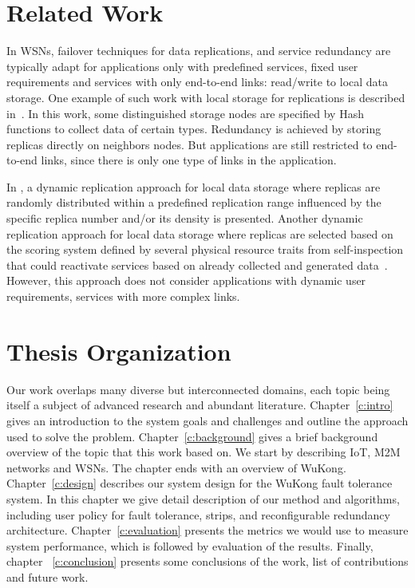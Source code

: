 \section{Related Work}


In WSNs, failover techniques for data replications, and service redundancy are
typically adapt for applications only with predefined services, fixed user
requirements and services with only end-to-end links: read/write to local data
storage. One example of such work with local storage for replications is
described in~\cite{Ratnasamy2002}. In this work, some distinguished storage
nodes are specified by Hash functions to collect data of certain types.
Redundancy is achieved by storing replicas directly on neighbors nodes. But
applications are still restricted to end-to-end links, since there is only one
type of links in the application.

In \cite{Piotrowski2009}, a dynamic replication approach for local data storage
where replicas are randomly distributed within a predefined replication range
influenced by the specific replica number and/or its density is presented. 
Another dynamic replication approach for local data storage where replicas are
selected based on the scoring system defined by several physical resource traits
from self-inspection that could reactivate services based on already collected
and generated data~\cite{Neumann2010}. However, this approach does not consider
applications with dynamic user requirements, services with more complex links.

\section{Thesis Organization}

Our work overlaps many diverse but interconnected domains, each topic being
itself a subject of advanced research and abundant literature.
Chapter~\ref{c:intro} gives an introduction to the system goals and challenges
and outline the approach used to solve the problem. Chapter~\ref{c:background}
gives a brief background overview of the topic that this work based on.  We
start by describing IoT, M2M networks and WSNs. The chapter ends with an
overview of WuKong. Chapter~\ref{c:design} describes our system design for the
WuKong fault tolerance system. In this chapter we give detail description of our
method and algorithms, including user policy for fault tolerance, strips, and
reconfigurable redundancy architecture.  Chapter~\ref{c:evaluation} presents the
metrics we would use to measure system performance, which is followed by
evaluation of the results. Finally, chapter ~\ref{c:conclusion} presents some
conclusions of the work, list of contributions and future work.
